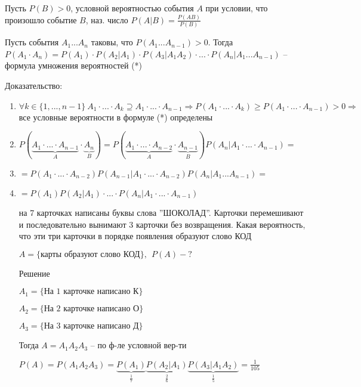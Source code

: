 
\OPR Пусть $P(B) > 0$, условной вероятностью события $A$ при условии, что произошло событие $B$, наз. число $P(A|B)=\tfrac{P(AB)}{P(B)}$

\THRM Пусть события $A_1...A_n$ таковы, что $P(A_1...A_{n-1})>0$. Тогда $P(A_1\cdot A_n) = P(A_1)\cdot P(A_2|A_1)\cdot P(A_3|A_1A_2)\cdot ... \cdot P(A_n|A_1...A_{n-1})$ -- формула умножения вероятностей (*)

Доказательство:
\begin{enumerate}[topsep=0pt, leftmargin=20pt, noitemsep]
	\item  $\forall k \in \{1,...,n-1\}~A_1\cdot ... \cdot A_k \supseteq A_1\cdot ... \cdot A_{n-1}\Rightarrow P(A_1\cdot ... \cdot A_k)\geq P(A_1\cdot ... \cdot A_{n-1})> 0\Rightarrow$ все условные вероятности в формуле (*) определены
	
	\item $P(\underbrace{A_1\cdot...\cdot A_{n-1}}_{A}\cdot \underbrace{A_n}_{B}) = P(\underbrace{A_1\cdot...\cdot A_{n-2}}_{A} \cdot \underbrace{A_{n-1}}_{B})P(A_n|A_1\cdot...\cdot A_{n-1})= $
	\item [] $= P(A_1\cdot...\cdot A_{n-2})P(A_{n-1}|A_1\cdot...\cdot A_{n-2})P(A_n|A_1...A_{n-1})=$
	\item [] $=P(A_1)P(A_2|A_1)\cdot...\cdot P(A_n|A_1\cdot...\cdot A_{n-1})$\newline
	
\PRIM на 7 карточках написаны буквы слова ''ШОКОЛАД''. Карточки перемешивают и последовательно вынимают 3 карточки без возвращения. Какая вероятность, что эти три карточки в порядке появления образуют слово КОД

$A = \{\text{карты образуют слово КОД}\}, ~~ P(A)-?$

Решение

$A_1 = \{\text{На 1 карточке написано К}\}$

$A_2 = \{\text{На 2 карточке написано О}\}$

$A_3 = \{\text{На 3 карточке написано Д}\}$

Тогда $A=A_1A_2A_3$ -- по ф-ле условной вер-ти 

$P(A) = P(A_1A_2A_3) = \underbrace{P(A_1)}_{\tfrac{1}{7}}\underbrace{P(A_2|A_1)}_{\tfrac{2}{6}}\underbrace{P(A_3|A_1A_2)}_{\tfrac{1}{5}} = \tfrac{1}{105}$

\end{enumerate}

\clearpage
